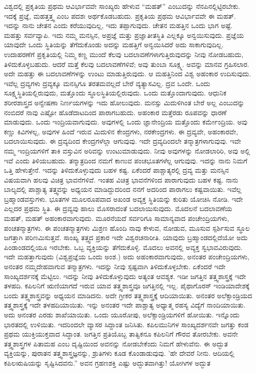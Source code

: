 ವಿಶ್ವದಲ್ಲಿ ಪ್ರಕೃತಿಯ ಪ್ರಥಮ ಆವಿರ್ಭಾವವೇ ಸಾಂಖ್ಯರು ಹೇಳುವ “ಮಹತ್'' ಎಂಬುದನ್ನು ನೆನಪಿನಲ್ಲಿಟ್ಟಿರಬೇಕು. ಇದಕ್ಕೆ ಪ್ರಜ್ಞೆ, ಮಹತ್ತತ್ತ್ವ ಎಂಬ ಪದಶಃ ಅರ್ಥಕೊಡಬಹುದು. ಪ್ರಕೃತಿಯ ಪ್ರಥಮ ಆವಿರ್ಭಾವವೇ ಈ ಮಹತ್. ಇದನ್ನು ನಾನು ಚೇತನ ಎಂದು ಕರೆಯುವುದಿಲ್ಲ, ಇದು ತಪ್ಪಾಗುವುದು. ಚೇತನ ಮಹತ್ತಿನ ಒಂದು ಭಾಗ ಅಷ್ಟೆ. ಮಹತ್ತು ಸರ್ವವ್ಯಾಪಿ. ಇದು ನಮ್ಮ ಮನಸ್ಸಿನ, ಅಪ್ರಜ್ಞೆ ಮತ್ತು ಪ್ರಜ್ಞಾತೀತಸ್ಥಿತಿ ಎಲ್ಲಕ್ಕೂ ಅನ್ವಯಿಸುವುದು. ಪ್ರಜ್ಞೆಯ ಯಾವುದೇ ಒಂದು ಸ್ಥಿತಿಯನ್ನು ತೆಗೆದುಕೊಂಡು ಅದನ್ನು ಮಹತ್ತಿಗೆ ಅನ್ವಯಿಸಿದರೆ ಅದು ಸಾಕಾಗುವುದಿಲ್ಲ. ಉದಾಹರಣೆಗೆ ಪ್ರಕೃತಿಯಲ್ಲಿ ನಿಮ್ಮ ಕಣ್ಣ ಮುಂದೆ ಕೆಲವು ಬದಲಾವಣೆಗಳಾಗುತ್ತಿರುವುದನ್ನು ನೀವು ನೋಡಬಹುದು, ತಿಳಿದುಕೊಳ್ಳಬಹುದು. ಆದರೆ ಮತ್ತೆ ಕೆಲವು ಬದಲಾವಣೆಗಳಿವೆ; ಅವು ತುಂಬಾ ಸೂಕ್ಷ್ಮ. ಅವನ್ನು ಮಾನವ ಗ್ರಹಿಸಲಾರ. ಅದೇ ಮಹತ್ತು ಈ ಬದಲಾವಣೆಗಳನ್ನು ಉಂಟು ಮಾಡುತ್ತಿರುವುದು. ಆ ಮಹತ್ತಿನಿಂದ ವಿಶ್ವ ಅಹಂಕಾರ ಉದಿಸುವುದು. ಇವೆಲ್ಲ ದ್ರವ್ಯಗಳು ದ್ರವ್ಯಕ್ಕೂ ಮನಸ್ಸಿಗೂ ತರತಮವಲ್ಲದೆ ಬೇರೆ ವ್ಯತ್ಯಾಸವಿಲ್ಲ. ದ್ರವ ಒಂದೇ. ಒಂದು ಸೂಕ್ಷ್ಮಸ್ಥಿತಿಯಲ್ಲಿರುವುದು, ಮತ್ತೊಂದು ಸ್ಥೂಲಸ್ಥಿತಿಯಲ್ಲಿರುವುದು. ಒಂದು ಮತ್ತೊಂದಾಗುವುದು. ಆಧುನಿಕ ಶರೀರಶಾಸ್ತ್ರದ ಅನ್ವೇಷಣಾ ನಿರ್ಣಯಗಳನ್ನು ಇದು ಹೋಲುವುದು. ಮನಸ್ಸು ಮಿದುಳಿಗಿಂತ ಬೇರೆ ಅಲ್ಲ ಎಂಬುದನ್ನು ನಂಬಿದರೆ ನಾವು ಎಷ್ಟೋ ಹೊಡೆದಾಟದಿಂದ ಪಾರಾಗಬಹುದು. ಅಹಂಕಾರ ಮತ್ತೆರಡು ರೂಪವನ್ನು ಧಾರಣೆ ಮಾಡುವುದು. ಒಂದು ಇಂದ್ರಿಯವಾಗುವುದು. ಅವುಗಳಲ್ಲಿ ಒಂದು ಜ್ಞಾನೇಂದ್ರಿಯ ಮತ್ತೊಂದು ಕರ್ಮೇಂದ್ರಿಯ. ಅವು ಕಣ್ಣು ಕಿವಿಗಳಲ್ಲ, ಅವುಗಳ ಹಿಂದೆ ಇರುವ ಮಿದುಳಿನ ಕೇಂದ್ರಗಳು, ನರಕೇಂದ್ರಗಳು. ಈ ದ್ರವ್ಯವೇ, ಅಹಂಕಾರವೇ, ಬದಲಾಯಿಸುವುದು. ಈ ದ್ರವ್ಯದಿಂದ ಕೇಂದ್ರಗಳೆಲ್ಲಾ ಆಗುವುವು. ಇದೇ ದ್ರವ್ಯದಿಂದಲೇ ತನ್ಮಾತ್ರಗಳಾಗುವುವು. ಇವೇ ನಮ್ಮ ಇಂದ್ರಿಯಗಳಿಗೆ ತಾಕಿ ವಸ್ತುವಿನ ಅರಿವನ್ನು ಉಂಟುಮಾಡುವುದು. ನೀವು ಅವುಗಳನ್ನು ನೋಡಲಾರಿರಿ, ಅವು ಅಲ್ಲಿ ಇವೆ ಎಂದು ತಿಳಿಯಬಹುದು. ತನ್ಮಾತ್ರದಿಂದ ನಮಗೆ ಕಾಣುವ ಪಂಚಭೂತಗಳೆಲ್ಲ ಆಗುವುವು. ಇದನ್ನು ನಾನು ನಿಮಗೆ ಒತ್ತಿ ಹೇಳುತ್ತೇನೆ. ಇದನ್ನು ತಿಳಿದುಕೊಳ್ಳುವುದು ಬಹಳ ಕಷ್ಟ. ಏಕೆಂದರೆ ಪಾಶ್ಚಾತ್ಯರಲ್ಲಿ ದ್ರವ್ಯ ಮತ್ತು ಮನಸ್ಸಿನ ವಿಷಯವಾಗಿ ಹಲವು ವಿಚಿತ್ರ ಭಾವನೆಗಳಿವೆ. ಇಂತಹ ವಿಚಿತ್ರ ಭಾವನೆಗಳಿಂದ ಪಾರಾಗುವುದು ಬಹಳ ಕಷ್ಟ. ನಾನು ಬಾಲ್ಯದಲ್ಲಿ ಪಾಶ್ಚಾತ್ಯ ತತ್ತ್ವವನ್ನು ಅಧ್ಯಯನ ಮಾಡಿದ್ದುದರಿಂದ ನನಗೆ ಅದರಿಂದ ಪಾರಾಗಲು ಕಷ್ಟವಾಯಿತು. ಇವೆಲ್ಲ ಬ್ರಹ್ಮಾಂಡವಸ್ತುಗಳು. ಭೂತಗಳ ಮೂಲರೂಪವಾದ ಅಖಂಡ ಅವ್ಯಕ್ತ ಸ್ಥಿತಿಯನ್ನು ಕುರಿತು ಯೋಚಿಸಿ ನೋಡಿ. ಇದೇ ಎಲ್ಲದರ ಪ್ರಥಮ ಸ್ಥಿತಿ. ಈ ದ್ರವ್ಯವು ಹಾಲು ಮೊಸರಾದಂತೆ ಬದಲಾಯಿಸುವುದು. ಮೊದಲನೆ ಬದಲಾವಣೆಯ ಮಹತ್, ಮಹತ್ ಅಹಂಕಾರವಾಗುವುದು. ಮೂರನೆಯದೆ ಸರ್ವರಿಗೂ ಸಾಮಾನ್ಯವಾದ ಪಂಚೇಂದ್ರಿಯಗಳು, ಪಂಚತನ್ಮಾತ್ರಗಳು. ಈ ಪಂಚತನ್ಮಾತ್ರಗಳು ಮಿಶ್ರಣ ಹೊಂದಿ ನಾವು ಕೇಳುವ, ನೋಡುವ, ಮೂಸುವ ಸ್ಪರ್ಶಿಸುವ ಸ್ಥೂಲ ಜಗತ್ತಾಗಿ ಪರಿಣಮಿಸುತ್ತವೆ. ಸಾಂಖ್ಯ ತತ್ತ್ವದ ಪ್ರಕಾರ ಇದೇ ವಿಶ್ವರಚನಾರೀತಿ. ಯಾವುದು ಬ್ರಹ್ಮಾಂಡದಲ್ಲಿದೆಯೋ ಅದು ಪಿಂಡಾಂಡದಲ್ಲಿಯೂ ಇರಬೇಕು. ಒಬ್ಬ ವ್ಯಕ್ತಿಯನ್ನು ತೆಗೆದುಕೊಳ್ಳಿ. ಮೊದಲು ಅವನಲ್ಲಿ ಅವ್ಯಕ್ತ ಸ್ವಭಾವವಿರುವುದು. ಇದೇ ಮಹತ್ತಾಗುವುದು (ವಿಶ್ವಪ್ರಜ್ಞೆಯ ಒಂದು ಅಂಶ.) ಅದು ಅಹಂಕಾರವಾಗುವುದು, ಅನಂತರ ಪಂಚೇಂದ್ರಿಯಗಳು, ಅನಂತರ ನಮ್ಮದೇಹವಾಗುವ ತನ್ಮಾತ್ರಗಳು. ಇದನ್ನು ನೀವು ಸ್ಪಷ್ಟವಾಗಿ ತಿಳಿದುಕೊಳ್ಳಬೇಕು. ಏಕೆಂದರೆ ಇದೇ ಸಾಂಖ್ಯದರ್ಶನಕ್ಕೆ ಮೆಟ್ಟಿಲು. ಇದನ್ನು ನೀವು ತಿಳಿದುಕೊಳ್ಳುವುದು ಅತ್ಯಂತ ಆವಶ್ಯಕ. ಇಡೀ ಜಗತ್ತಿನ ತತ್ತ್ವಶಾಸ್ತ್ರಕ್ಕೆ ಇದೇ ತಳಹದಿ. ಕಪಿಲನಿಗೆ ಋಣಿಯಾಗದೆ ಇರುವ ಯಾವ ತತ್ತ್ವಶಾಸ್ತ್ರವೂ ಜಗತ್ತಿನಲ್ಲಿ ಇಲ್ಲ. ಪೈಥಾಗೊರಸ್ ಇಂಡಿಯಾದೇಶಕ್ಕೆ ಬಂದು ತತ್ತ್ವಶಾಸ್ತ್ರವನ್ನು ಅಧ್ಯಯನ ಮಾಡಿದನು. ಅದೇ ಗ್ರೀಕರ ತತ್ತ್ವಶಾಸ್ತ್ರಕ್ಕೆ ಆದಿಯಾಯಿತು. ಅನಂತರ ಅಲೆಕ್ಸಾಂಡ್ರಿಯದ ತತ್ತ್ವಶಾಸ್ತ್ರಕ್ಕೆ ಇದೇ ತಳಹದಿಯಾಯಿತು. ಇನ್ನು ಅನಂತರ ಇದೇ ಪಾಶ್ಚಾತ್ಯ ಅಧ್ಯಾತ್ಮ ರಹಸ್ಯ ವಿದ್ಯೆಗೆ ನಾಂದಿಯಾಯಿತು. ಅದು ಅನಂತರ ಎರಡು ಶಾಖೆಯಾಯಿತು. ಒಂದು ಯೂರೋಪು, ಅಲೆಕ್ಸಾಂಡ್ರಿಯಗಳಿಗೆ ಹೋಯಿತು. ಇನ್ನೊಂದು ಭಾರತದಲ್ಲಿ ಉಳಿಯಿತು. ಇದರಿಂದಲೇ ವ್ಯಾಸರ ಸಿದ್ದಾಂತ ಜನಿಸಿತು. ಕಪಿಲಮುನಿಗಳ ಸಾಂಖ್ಯದರ್ಶನವೇ ಜಗತ್ತು ಕಂಡ ಪ್ರಥಮ ಯುಕ್ತಿಯುಕ್ತವಾದ ಸಿದ್ಧಾಂತ. ಜಗತ್ತಿನ ಪ್ರತಿಯೊಬ್ಬ ತಾತ್ವಿಕನೂ ಕಪಿಲನಿಗೆ ಗೌರವ ತೋರಬೇಕು. ಅವನೇ ತತ್ತ್ವಶಾಸ್ತ್ರಗಳ ಪಿತಾಮಹ ಎಂಬ ದೃಷ್ಟಿಯಿಂದ ಅವನನ್ನು ನೋಡಬೇಕೆಂದು ನಿಮಗೆ ಹೇಳುವೆನು. ಈ ಅದ್ಭುತ ವ್ಯಕ್ತಿಯನ್ನು, ಪುರಾತನ ತತ್ತ್ವಶಾಸ್ತ್ರಜ್ಞನನ್ನು, ಶ್ರುತಿಗಳು ಕೂಡ ಕೊಂಡಾಡುವುವು. 'ಹೇ ದೇವರೆ ನೀನು. ಆದಿಯಲ್ಲಿ ಕಪಿಲಋಷಿಯನ್ನು ಸೃಷ್ಟಿಸಿದವನು.'' ಅವನ ಗ್ರಹಣಶಕ್ತಿ ಎಷ್ಟು ಅದ್ಭುತವಾಗಿತ್ತು! ಯೋಗಿಗಳ ಅದ್ಭುತ 